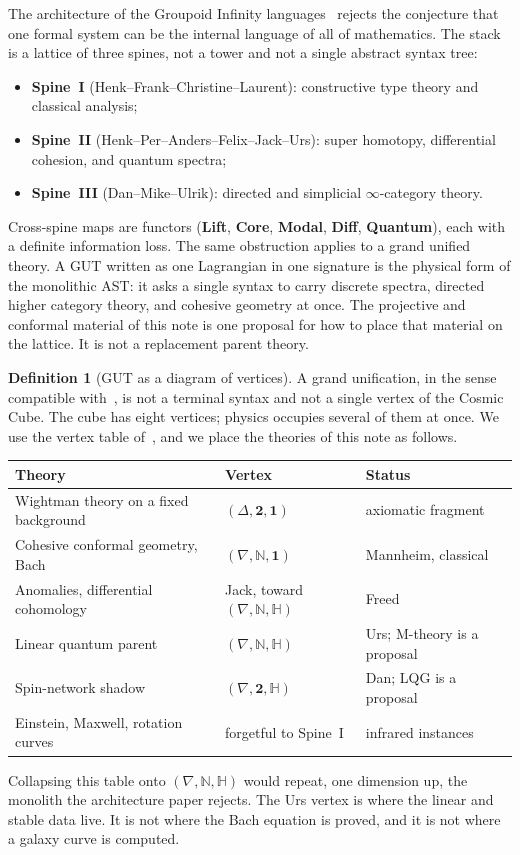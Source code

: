 \documentclass{article}
\theoremstyle{definition}
\newtheorem{definition}{Definition}
\begin{document}
The architecture of the Groupoid Infinity languages~\cite{GIArch} rejects the
conjecture that one formal system can be the internal language of all of
mathematics.  The stack is a lattice of three spines, not a tower and not a
single abstract syntax tree:
\begin{itemize}
  \item \textbf{Spine~I} (Henk--Frank--Christine--Laurent): constructive type
        theory and classical analysis;
  \item \textbf{Spine~II} (Henk--Per--Anders--Felix--Jack--Urs): super homotopy,
        differential cohesion, and quantum spectra;
  \item \textbf{Spine~III} (Dan--Mike--Ulrik): directed and simplicial
        \(\infty\)-category theory.
\end{itemize}
Cross-spine maps are functors (\textbf{Lift}, \textbf{Core}, \textbf{Modal},
\textbf{Diff}, \textbf{Quantum}), each with a definite information loss.
The same obstruction applies to a grand unified theory.  A GUT written as one
Lagrangian in one signature is the physical form of the monolithic AST: it
asks a single syntax to carry discrete spectra, directed higher category
theory, and cohesive geometry at once.  The projective and conformal material
of this note is one proposal for how to place that material on the lattice.
It is not a replacement parent theory.

\begin{definition}[GUT as a diagram of vertices]
A grand unification, in the sense compatible with~\cite{GIArch}, is not a
terminal syntax and not a single vertex of the Cosmic Cube.  The cube has
eight vertices; physics occupies several of them at once.  We use the vertex
table of~\cite{GIArch}, and we place the theories of this note as follows.
\begin{center}
\begin{tabular}{lll}
\hline
Theory & Vertex & Status \\
\hline
Wightman theory on a fixed background & \((\Delta,\mathbf{2},\mathbf{1})\) & axiomatic fragment \\
Cohesive conformal geometry, Bach & \((\nabla,\mathbb{N},\mathbf{1})\) & Mannheim, classical \\
Anomalies, differential cohomology & Jack, toward \((\nabla,\mathbb{N},\mathbb{H})\) & Freed \\
Linear quantum parent & \((\nabla,\mathbb{N},\mathbb{H})\) & Urs; M-theory is a proposal \\
Spin-network shadow & \((\nabla,\mathbf{2},\mathbb{H})\) & Dan; LQG is a proposal \\
Einstein, Maxwell, rotation curves & forgetful to Spine~I & infrared instances \\
\hline
\end{tabular}
\end{center}
Collapsing this table onto \((\nabla,\mathbb{N},\mathbb{H})\) would repeat, one
dimension up, the monolith the architecture paper rejects.  The Urs vertex is
where the linear and stable data live.  It is not where the Bach equation is
proved, and it is not where a galaxy curve is computed.
\end{definition}
\end{document}
